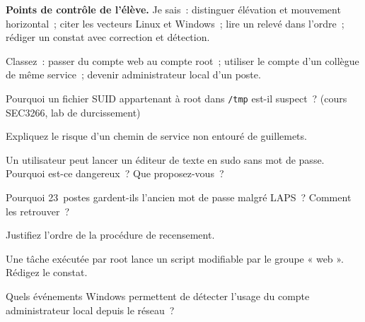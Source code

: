 \begin{boxinfo}
\textbf{Points de contrôle de l'élève.} Je sais~: distinguer élévation et
mouvement horizontal~; citer les vecteurs Linux et Windows~; lire un relevé
dans l'ordre~; rédiger un constat avec correction et détection.
\end{boxinfo}

\bigskip

\begin{boxexo}[title={\ding{45}\quad Exercice~11.1. Vertical ou horizontal \niveaubase}]
Classez~: passer du compte web au compte root~; utiliser le compte d'un
collègue de même service~; devenir administrateur local d'un poste.
\end{boxexo}

\begin{boxexo}[title={\ding{45}\quad Exercice~11.2. SUID \niveaubase}]
Pourquoi un fichier SUID appartenant à root dans \texttt{/tmp} est-il
suspect~? (cours SEC3266, lab de durcissement)
\end{boxexo}

\begin{boxexo}[title={\ding{45}\quad Exercice~11.3. Chemin \niveaubase}]
Expliquez le risque d'un chemin de service non entouré de guillemets.
\end{boxexo}

\begin{boxexo}[title={\ding{45}\quad Exercice~11.4. sudo \niveaumoyen}]
Un utilisateur peut lancer un éditeur de texte en sudo sans mot de passe.
Pourquoi est-ce dangereux~? Que proposez-vous~?
\end{boxexo}

\begin{boxexo}[title={\ding{45}\quad Exercice~11.5. Le script \niveaumoyen}]
Pourquoi 23~postes gardent-ils l'ancien mot de passe malgré LAPS~?
Comment les retrouver~?
\end{boxexo}

\begin{boxexo}[title={\ding{45}\quad Exercice~11.6. Ordre \niveaumoyen}]
Justifiez l'ordre de la procédure de recensement.
\end{boxexo}

\begin{boxexo}[title={\ding{45}\quad Exercice~11.7. Tâche planifiée \niveaumoyen}]
Une tâche exécutée par root lance un script modifiable par le groupe
« web ». Rédigez le constat.
\end{boxexo}

\begin{boxexo}[title={\ding{45}\quad Exercice~11.8. Détecter \niveaumoyen}]
Quels événements Windows permettent de détecter l'usage du compte
administrateur local depuis le réseau~?
\end{boxexo}

